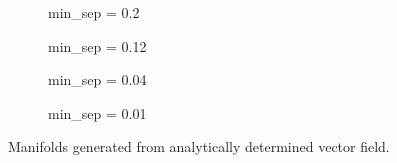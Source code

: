 \begin{figure}[htpb]
    \centering
    \begin{subfigure}[b]{0.475\textwidth}
        \centering
        
        \caption[]{{\small min\_sep = 0.2}}
        \label{fig:u0_dom_err_bs32}
    \end{subfigure}
    \begin{subfigure}[b]{0.475\textwidth}
        \centering
        
        \caption[]{{\small min\_sep = 0.12}}
        \label{fig:u0_dom_err_bs54}
    \end{subfigure}

    \begin{subfigure}[b]{0.475\textwidth}
        \centering
        
        \caption[]{{\small min\_sep = 0.04}}
        \label{fig:u0_dom_err_dp54}
    \end{subfigure}
    \begin{subfigure}[b]{0.475\textwidth}
        \centering
        
        \caption[]{{\small min\_sep = 0.01}}
        \label{fig:u0_dom_err_dp87}
    \end{subfigure}
    \caption[Veni, vidi, Aviici]{Manifolds generated from analytically determined vector field.}
    \label{fig:u0_dom_errs}
\end{figure}

